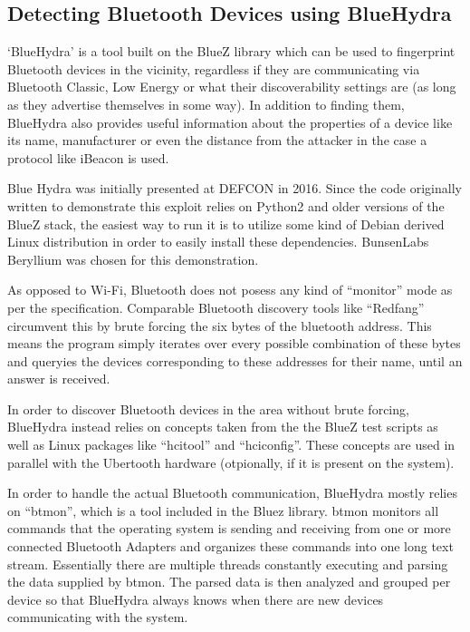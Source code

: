 \begin{itemize}
\subsection{Detecting Bluetooth Devices using BlueHydra}
`BlueHydra'  is a tool built on the BlueZ library which can be used to fingerprint Bluetooth devices in the vicinity, regardless if they are communicating via Bluetooth Classic, Low Energy or what their discoverability settings are (as long as they advertise themselves in some way).\cite{bluehydragit} In addition to finding them, BlueHydra also provides useful information about the properties of a device like its name, manufacturer or even the distance from the attacker in the case a protocol like iBeacon is used.

Blue Hydra was initially presented at DEFCON in 2016. Since the code originally written to demonstrate this exploit relies on Python2 and older versions of the BlueZ stack, the easiest way to run it is to utilize some kind of Debian derived Linux distribution in order to easily install these dependencies. BunsenLabs Beryllium was chosen for this demonstration.

As opposed to Wi-Fi, Bluetooth does not posess any kind of ``monitor'' mode as per the specification. Comparable Bluetooth discovery tools like ``Redfang'' circumvent this by brute forcing the six bytes of the bluetooth address. This means the program simply iterates over every possible combination of these bytes and queryies the devices corresponding to these addresses for their name, until an answer is received.\cite{redfang}

In order to discover Bluetooth devices in the area without brute forcing, BlueHydra instead relies on concepts taken from the the BlueZ test scripts as well as Linux packages like ``hcitool'' and ``hciconfig''. These concepts are used in parallel with the Ubertooth hardware (otpionally, if it is present on the system).\cite{defcon}


In order to handle the actual Bluetooth communication, BlueHydra mostly relies on ``btmon'', which is a tool included in the Bluez library. btmon monitors all commands that the operating system is sending and receiving from one or more connected Bluetooth Adapters and organizes these commands into one long text stream. 
Essentially there are multiple threads constantly executing and parsing the data supplied by btmon. The parsed data is then analyzed and grouped per device so that BlueHydra always knows when there are new devices communicating with the system.


\end{itemize}
